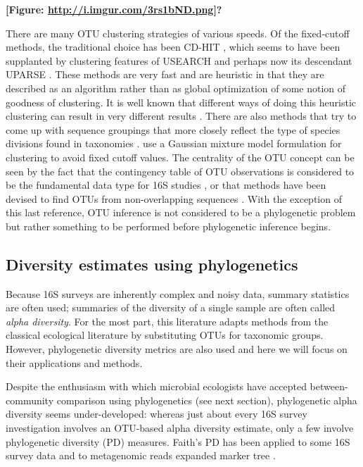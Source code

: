 \documentclass{amsart}
\begin{document}
\textbf{[Figure: \url{http://i.imgur.com/3rs1bND.png}]?}

There are many OTU clustering strategies of various speeds.
Of the fixed-cutoff methods, the traditional choice has been CD-HIT \citep{li2006cdhit}, which seems to have been supplanted by clustering features of USEARCH \citep{edgar2010usearch} and perhaps now its descendant UPARSE \citep{edgar2013uparse}.
These methods are very fast and are heuristic in that they are described as an algorithm rather than as global optimization of some notion of goodness of clustering.
It is well known that different ways of doing this heuristic clustering can result in very different results \citep{white2010alignment}.
There are also methods that try to come up with sequence groupings that more closely reflect the type of species divisions found in taxonomies \citep{navlakha2009finding}.
\citet{hao2011clustering} use a Gaussian mixture model formulation for clustering to avoid fixed cutoff values.
The centrality of the OTU concept can be seen by the fact that the contingency table of OTU observations is considered to be the fundamental data type for 16S studies \citep{mcdonald2012biological}, or that methods have been devised to find OTUs from non-overlapping sequences \citep{sharpton2011phylotu}.
With the exception of this last reference, OTU inference is not considered to be a phylogenetic problem but rather something to be performed before phylogenetic inference begins.


\subsection{Diversity estimates using phylogenetics}
Because 16S surveys are inherently complex and noisy data, summary statistics are often used; summaries of the diversity of a single sample are often called \emph{alpha diversity}.
For the most part, this literature adapts methods from the classical ecological literature by substituting OTUs for taxonomic groups.
However, phylogenetic diversity metrics are also used and here we will focus on their applications and methods.

Despite the enthusiasm with which microbial ecologists have accepted between-community comparison using phylogenetics (see next section), phylogenetic alpha diversity seems under-developed: whereas just about every 16S survey investigation involves an OTU-based alpha diversity estimate, only a few involve phylogenetic diversity (PD) measures.
Faith's PD \citep{faith1992conservation} has been applied to some 16S survey data \citep{lozupone2007global,costello2009bacterial} and to metagenomic reads expanded marker tree \citep{kembel2011phylogenetic}.
\end{document}
